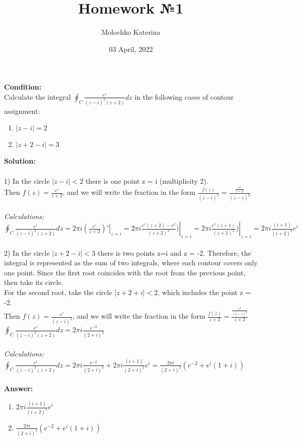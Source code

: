 \documentclass{article}
\title{Homework №1}%
\author{Molochko Katerina}%
\date{ 03 April, 2022}%
\begin{document}
\maketitle%
\textbf{Condition:} 
\\Calculate the integral \( \oint_C \frac{e^z}{(z - i)^2(z + 2)}{dz} \) in the following cases of contour assignment:
\begin{enumerate}
  \item  \(|z - i|=2\)
  \item  \(|z + 2 - i| = 3\)
\end{enumerate}

\textbf{Solution:} 
\\
\\ 1) In the circle $|z - i| < 2$ there is one point z = i  (multiplicity 2).
\\ Then $f(z)=\frac{e^z}{z + 2}$, and we will write the fraction in the form $\frac{f(z)}{(z - i)^2}=\frac{\frac{e^z}{z + 2}}{(z - i)^2}$
\\ 
\\ \textit{Calculations:} 
\\ \( \oint_C \frac{e^z}{(z - i)^2(z + 2)}{dz} = \left. 2\pi i (\frac{e^z}{z + 2})'\right|_{z = i} = \left. 2\pi i \frac{e^z(z + 2)-e^z}{(z + 2)^2})\right|_{z = i}= \left. 2\pi i \frac{e^z(z + 1)}{(z + 2)^2})\right|_{z = i} =  2\pi i \frac{(i + 1)}{(i + 2)^2}{e^i}\)
\\
\\ 2)  In the circle $|z + 2 - i| < 3$ there is two points z=i and z = -2. Therefore, the integral is represented as the sum of two integrals, where each contour covers only one point. Since the first root coincides with the root from the previous point, then take its circle.
\\ For the second root, take the circle $|z + 2 + i| < 2$, which includes the point z = -2.
\\Then $f(z)=\frac{e^z}{(z - i)^2}$, and we will write the fraction in the form $\frac{f(z)}{z + 2}=\frac{\frac{e^z}{(z - i)^2}}{z + 2}$
\\ \( \oint_C \frac{e^z}{(z - i)^2(z + 2)}{dz}=  2\pi i \frac{e^{-2}}{(2 + i)^2}\)
\\
\\ \textit{Calculations:} 
\\  \( \oint_C \frac{e^z}{(z - i)^2(z + 2)}{dz}=  2\pi i \frac{e^{-2}}{(2 + i)^2}+ 2\pi i \frac{(i + 1)}{(2 + i)^2}{e^i}=\frac{2\pi i}{(2 + i)^2}{(e^{-2}+e^i(1 + i))}\)
\\
\\\textbf{Answer:}
\begin{enumerate}
  \item  \(2\pi i \frac{(i + 1)}{(i + 2)^2}{e^i}\)
  \item  \(\frac{2\pi i}{(2 +i)^2}{(e^{-2}+e^i(1+i))}\)
\end{enumerate}
\end{document}
